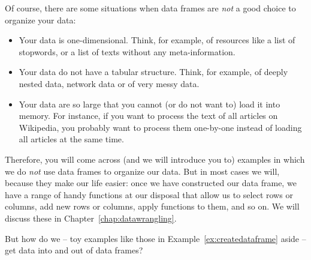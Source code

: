 Of course, there are some situations when data frames are \emph{not} a good choice to organize your data:
\begin{itemize}
\item Your data is one-dimensional. Think, for example, of resources like a list of stopwords, or a list of texts without any meta-information.
\item Your data do not have a tabular structure. Think, for example, of deeply nested data, network data or of very messy data.
\item Your data are so large that you cannot (or do not want to) load it into memory. For instance, if you want to process the text of all articles on Wikipedia, you probably want to process them one-by-one instead of loading all articles at the same time.
\end{itemize}



Therefore, you will come across (and we will introduce you to) examples in which we do \emph{not} use data frames to organize our data.
But in most cases we will, because they make our life easier:
once we have constructed our data frame, we have a range of handy functions at our disposal that allow us to select rows or columns, add new rows or columns, apply functions to them, and so on.
We will discuss these in Chapter~\ref{chap:datawrangling}.

But how do we -- toy examples like those in Example~\ref{ex:createdataframe} aside -- get data into and out of data frames?






